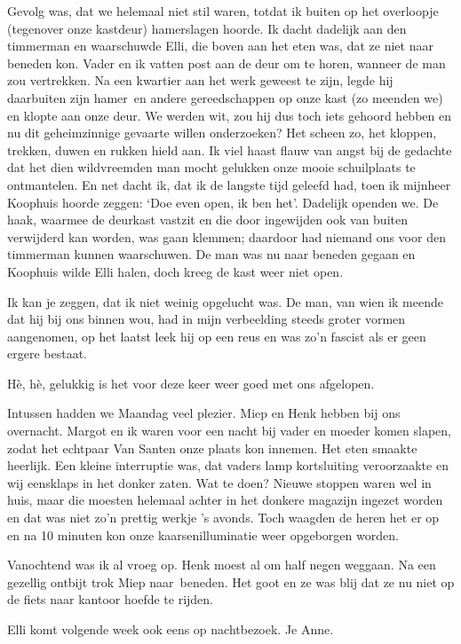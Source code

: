 \documentclass{book}
\begin{document}
Gevolg was, dat we helemaal niet stil waren, totdat ik buiten op het overloopje
(tegenover onze kastdeur) hamerslagen hoorde. Ik dacht dadelijk aan den
timmerman en waarschuwde Elli, die boven aan het eten was, dat ze niet naar
beneden kon. Vader en ik vatten post aan de deur om te horen, wanneer de man zou
vertrekken. Na een kwartier aan het werk geweest te zijn, legde hij daarbuiten
zijn hamer~en andere gereedschappen op onze kast (zo meenden we) en klopte aan
onze deur. We werden wit, zou hij dus toch iets gehoord hebben en nu dit
geheimzinnige gevaarte willen onderzoeken? Het scheen zo, het kloppen, trekken,
duwen en rukken hield aan. Ik viel haast flauw van angst bij de gedachte dat het
dien wildvreemden man mocht gelukken onze mooie schuilplaats te ontmantelen. En
net dacht ik, dat ik de langste tijd geleefd had, toen ik mijnheer Koophuis
hoorde zeggen: `Doe even open, ik ben het'.  Dadelijk openden we. De haak,
waarmee de deurkast vastzit en die door ingewijden ook van buiten verwijderd kan
worden, was gaan klemmen; daardoor had niemand ons voor den timmerman kunnen
waarschuwen. De man was nu naar beneden gegaan en Koophuis wilde Elli halen,
doch kreeg de kast weer niet open.

Ik kan je zeggen, dat ik niet weinig opgelucht was. De man, van wien ik meende
dat hij bij ons binnen wou, had in mijn verbeelding steeds groter vormen
aangenomen, op het laatst leek hij op een reus en was zo'n fascist als er geen
ergere bestaat.

Hè, hè, gelukkig is het voor deze keer weer goed met ons afgelopen.

Intussen hadden we Maandag veel plezier. Miep en Henk hebben bij ons overnacht.
Margot en ik waren voor een nacht bij vader en moeder komen slapen, zodat het
echtpaar Van Santen onze plaats kon innemen. Het eten smaakte heerlijk. Een
kleine interruptie was, dat vaders lamp kortsluiting veroorzaakte en wij
eensklaps in het donker zaten. Wat te doen? Nieuwe stoppen waren wel in huis,
maar die moesten helemaal achter in het donkere magazijn ingezet worden en dat
was niet zo'n prettig werkje 's avonds. Toch waagden de heren het er op en na 10
minuten kon onze kaarsenilluminatie weer opgeborgen worden.

Vanochtend was ik al vroeg op. Henk moest al om half negen weggaan. Na een
gezellig ontbijt trok Miep naar~beneden. Het goot en ze was blij dat ze nu niet
op de fiets naar kantoor hoefde te rijden.

Elli komt volgende week ook eens op nachtbezoek. Je Anne.
\end{document}
